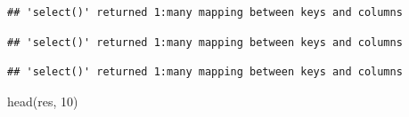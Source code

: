 \documentclass[
]{article}
\newenvironment{Shaded}{\begin{snugshade}}{\end{snugshade}}
\newcommand{\AttributeTok}[1]{\textcolor[rgb]{0.77,0.63,0.00}{#1}}
\newcommand{\DecValTok}[1]{\textcolor[rgb]{0.00,0.00,0.81}{#1}}
\newcommand{\FunctionTok}[1]{\textcolor[rgb]{0.00,0.00,0.00}{#1}}
\newcommand{\NormalTok}[1]{#1}
\newcommand{\OtherTok}[1]{\textcolor[rgb]{0.56,0.35,0.01}{#1}}
\newcommand{\SpecialCharTok}[1]{\textcolor[rgb]{0.00,0.00,0.00}{#1}}
\newcommand{\StringTok}[1]{\textcolor[rgb]{0.31,0.60,0.02}{#1}}
\begin{document}
\begin{verbatim}
## 'select()' returned 1:many mapping between keys and columns
\end{verbatim}

\begin{Shaded}
\end{Shaded}

\begin{verbatim}
## 'select()' returned 1:many mapping between keys and columns
\end{verbatim}

\begin{Shaded}
\end{Shaded}

\begin{verbatim}
## 'select()' returned 1:many mapping between keys and columns
\end{verbatim}

\begin{Shaded}
\begin{Highlighting}[]
\FunctionTok{head}\NormalTok{(res, }\DecValTok{10}\NormalTok{)}
\end{Highlighting}
\end{Shaded}
\end{document}
